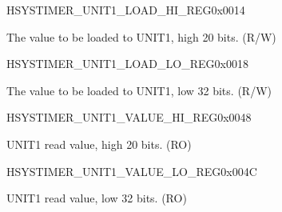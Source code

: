 \begin{register}{H}{SYSTIMER\_UNIT1\_LOAD\_HI\_REG}{0x0014}\label{regdesc:SYSTIMERUNIT1LOADHIREG}
%
%
\regnewline%
\begin{regdesc}\begin{reglist}
\label{fielddesc:SYSTIMERTIMERUNIT1LOADHI}\item [SYSTIMER\_TIMER\_UNIT1\_LOAD\_HI] The value to be loaded to UNIT1, high 20 bits. (R/W)
\end{reglist}\end{regdesc}
\end{register}


\begin{register}{H}{SYSTIMER\_UNIT1\_LOAD\_LO\_REG}{0x0018}\label{regdesc:SYSTIMERUNIT1LOADLOREG}
%
\regnewline%
\begin{regdesc}\begin{reglist}
\label{fielddesc:SYSTIMERTIMERUNIT1LOADLO}\item [SYSTIMER\_TIMER\_UNIT1\_LOAD\_LO] The value to be loaded to UNIT1, low 32 bits. (R/W)
\end{reglist}\end{regdesc}
\end{register}


\begin{register}{H}{SYSTIMER\_UNIT1\_VALUE\_HI\_REG}{0x0048}\label{regdesc:SYSTIMERUNIT1VALUEHIREG}
%
%
\regnewline%
\begin{regdesc}\begin{reglist}
\label{fielddesc:SYSTIMERTIMERUNIT1VALUEHI}\item [SYSTIMER\_TIMER\_UNIT1\_VALUE\_HI] UNIT1 read value, high 20 bits. (RO)
\end{reglist}\end{regdesc}
\end{register}


\begin{register}{H}{SYSTIMER\_UNIT1\_VALUE\_LO\_REG}{0x004C}\label{regdesc:SYSTIMERUNIT1VALUELOREG}
%
\regnewline%
\begin{regdesc}\begin{reglist}
\label{fielddesc:SYSTIMERTIMERUNIT1VALUELO}\item [SYSTIMER\_TIMER\_UNIT1\_VALUE\_LO] UNIT1 read value, low 32 bits. (RO)
\end{reglist}\end{regdesc}
\end{register}


